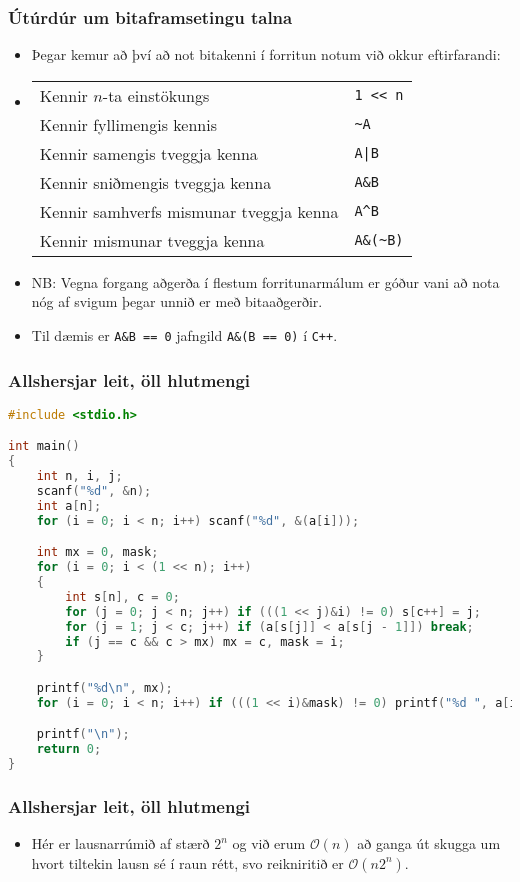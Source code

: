 \documentclass{beamer}
\renewcommand\O{\mathcal{O}}
\begin{document}
\begin{frame}
	\frametitle{Útúrdúr um bitaframsetingu talna}
\begin{itemize}
	\item<1->  Þegar kemur að því að not bitakenni í forritun notum við okkur eftirfarandi:
	\item<2->[]
\begin{tabular}{| l | l |}
\hline
Kennir $n$-ta einstökungs & \quad \texttt{1 << n}\\
Kennir fyllimengis kennis & \quad \texttt{\textasciitilde{A}}\\
Kennir samengis tveggja kenna & \quad \texttt{A|B}\\
Kennir sniðmengis tveggja kenna & \quad \texttt{A\&B}\\
Kennir samhverfs mismunar tveggja kenna & \quad \texttt{A\textasciicircum B}\\
Kennir mismunar tveggja kenna & \quad \texttt{A\&(\textasciitilde{B})}\\
\hline
\end{tabular}
	\item<3-> NB: Vegna forgang aðgerða í flestum forritunarmálum er góður vani að nota nóg af svigum þegar unnið er með bitaaðgerðir.
	\item<4-> Til dæmis er \texttt{A\&B == 0} jafngild \texttt{A\&(B == 0)} í \texttt{C++}.
\end{itemize}
\end{frame}

\begin{frame}[fragile]
	\frametitle{Allshersjar leit, öll hlutmengi}
\tiny
\begin{lstlisting}[language=C]
#include <stdio.h>

int main()
{
	int n, i, j;
	scanf("%d", &n);
	int a[n];
	for (i = 0; i < n; i++) scanf("%d", &(a[i]));

	int mx = 0, mask;
	for (i = 0; i < (1 << n); i++)
	{
		int s[n], c = 0;
		for (j = 0; j < n; j++) if (((1 << j)&i) != 0) s[c++] = j;
		for (j = 1; j < c; j++) if (a[s[j]] < a[s[j - 1]]) break;
		if (j == c && c > mx) mx = c, mask = i;
	}

	printf("%d\n", mx);
	for (i = 0; i < n; i++) if (((1 << i)&mask) != 0) printf("%d ", a[i]);

	printf("\n");
	return 0;
}
\end{lstlisting}
\end{frame}

\begin{frame}
	\frametitle{Allshersjar leit, öll hlutmengi}
\begin{itemize}
	\item<1-> Hér er lausnarrúmið af stærð $2^n$ og við erum $\O(n)$ að ganga út skugga um hvort tiltekin lausn sé í raun rétt, svo reikniritið er
		$\O(n2^n)$.
\end{itemize}
\end{frame}
\end{document}
